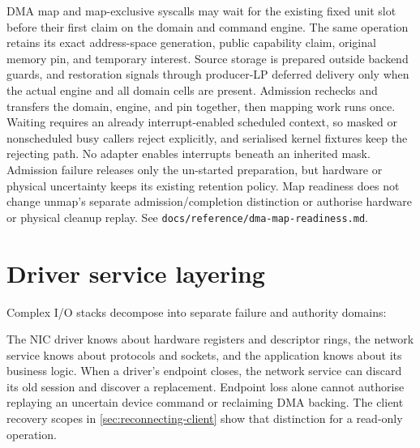 DMA map and map-exclusive syscalls may wait for the existing fixed unit slot
before their first claim on the domain and command engine. The same operation retains its
exact address-space generation, public capability claim, original memory pin,
and temporary interest. Source storage is prepared outside backend guards, and
restoration signals through producer-LP deferred delivery only when the actual
engine and all domain cells are present. Admission rechecks and transfers the
domain, engine, and pin together, then mapping work runs once. Waiting requires
an already interrupt-enabled scheduled context, so masked or nonscheduled busy
callers reject explicitly, and serialised kernel fixtures keep the rejecting
path. No adapter enables interrupts beneath an inherited mask. Admission failure
releases only the un-started preparation, but hardware or physical uncertainty keeps
its existing retention policy. Map readiness does not change unmap's separate
admission/completion distinction or authorise hardware or physical cleanup
replay. See \texttt{docs/reference/dma-map-readiness.md}.

\section{Driver service layering}

Complex I/O stacks decompose into separate failure and authority domains:

\begin{center}
\end{center}

The NIC driver knows about hardware registers and descriptor rings, the network
service knows about protocols and sockets, and the application knows about its
business logic. When a driver's endpoint closes, the network service can discard
its old session and discover a replacement. Endpoint loss alone cannot authorise
replaying an uncertain device command or reclaiming DMA backing. The client
recovery scopes in \autoref{sec:reconnecting-client} show that distinction for a
read-only operation.

